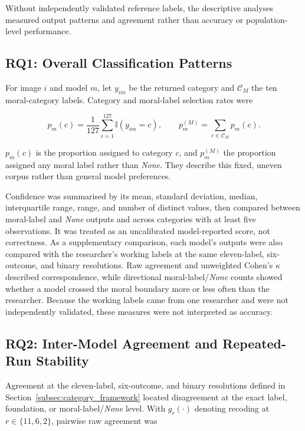 Without independently validated reference labels, the descriptive analyses
measured output patterns and agreement rather than accuracy or
population-level performance.


\subsection{RQ1: Overall Classification Patterns}

For image \(i\) and model \(m\), let \(y_{im}\) be the returned category and
\(\mathcal{C}_{M}\) the ten moral-category labels. Category and moral-label
selection rates were

\begin{equation}
    p_m(c)
    =
    \frac{1}{127}
    \sum_{i=1}^{127}
    \mathbb{I}\!\left(y_{im}=c\right),
    \qquad
    p_m^{(M)}
    =
    \sum_{c\in\mathcal{C}_{M}}p_m(c).
\end{equation}

\(p_m(c)\) is the proportion assigned to category \(c\), and \(p_m^{(M)}\) the
proportion assigned any moral label rather than \textit{None}. They describe
this fixed, uneven corpus rather than general model preferences.

Confidence was summarised by its mean, standard deviation, median,
interquartile range, range, and number of distinct values, then compared
between moral-label and \textit{None} outputs and across categories with at
least five observations. It was treated as an uncalibrated model-reported
score, not correctness. As a supplementary comparison, each model's outputs were also compared with
the researcher's working labels at the same eleven-label, six-outcome, and
binary resolutions. Raw agreement and unweighted Cohen's \(\kappa\) described
correspondence, while directional moral-label/\textit{None} counts showed
whether a model crossed the moral boundary more or less often than the
researcher. Because the working labels came from one researcher and were not
independently validated, these measures were not interpreted as accuracy.


\subsection{RQ2: Inter-Model Agreement and Repeated-Run Stability}
\label{subsec:inter_model}

Agreement at the eleven-label, six-outcome, and binary resolutions defined in
Section~\ref{subsec:category_framework} located disagreement at the exact
label, foundation, or moral-label/\textit{None} level. With \(g_r(\cdot)\)
denoting recoding at \(r\in\{11,6,2\}\), pairwise raw agreement was

